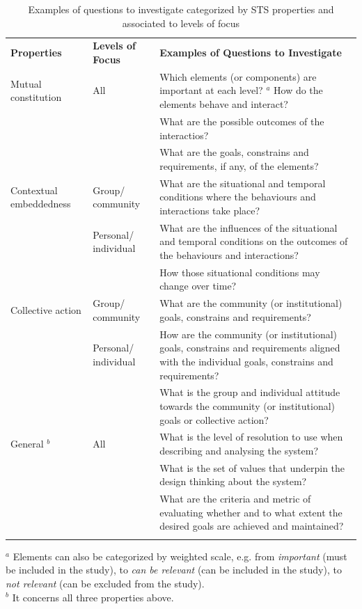 \begin{table}
\caption{Examples of questions to investigate categorized by STS properties and associated to levels of focus}
\label{tab:questions}       %
%
%
\begin{tabular}{>{\raggedright}p{2cm}>{\raggedright}p{2.1cm}p{7.5cm}}
\hline\noalign{\smallskip}
\textbf{Properties}  & \textbf{Levels of Focus} &   \textbf{Examples of Questions to Investigate} \\
\noalign{\smallskip}\svhline\noalign{\smallskip}
Mutual constitution & All  & Which elements (or components) are important at each level? $^a$  How do the elements behave and interact?\\
 &  & What are the possible outcomes of the interactios?\\
 &  & What are the goals, constrains and requirements, if any, of the elements?\\ \hline\noalign{\smallskip}
Contextual embeddedness &   Group/ community & What are the situational and temporal conditions where the behaviours and interactions take place? \\
 & Personal/ individual  & What are the influences of  the situational and temporal conditions on the outcomes of the behaviours and interactions?\\
 &  & How those situational conditions may change over time?\\ \hline\noalign{\smallskip}
Collective action   & Group/ community & What are the community (or institutional) goals, constrains and requirements?\\
   &  Personal/ individual  & How are the community (or institutional) goals, constrains and requirements aligned with the individual goals, constrains and requirements? \\
   & & What is the group and individual attitude towards the community (or institutional) goals or collective action? \\ \hline\noalign{\smallskip}
General $^b$ & All  & What is the level of resolution to use when describing and analysing the system? \\
& & What is the set of values that underpin the design thinking about the system? \\
& & What are the criteria and metric of evaluating whether and to what extent the desired goals are achieved and maintained? \\
\noalign{\smallskip}\hline\noalign{\smallskip}
\end{tabular}
$^a$ Elements can also be categorized by weighted scale, e.g. from \textit{important} (must be included in the study), to \textit{can be relevant} (can be included in the study), to \textit{not relevant} (can be excluded from the study).\\
$^b$ It concerns all three properties above. 
\end{table}
